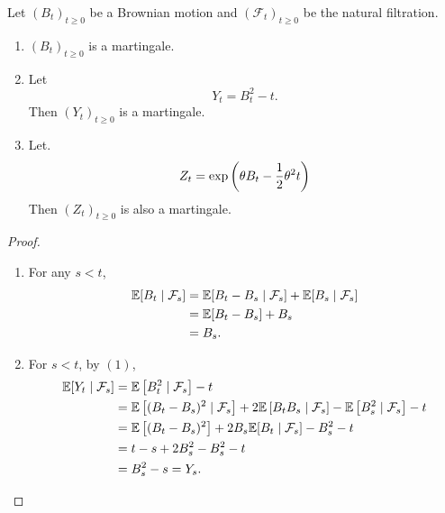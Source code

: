 \begin{exam}
    Let $(B_t)_{t \geq 0}$ be a Brownian motion and $(\mathcal{F}_t)_{t \geq 0}$ be the natural filtration.
    \begin{enumerate}[label=(\arabic{*})]
        \item $(B_t)_{t \geq 0}$ is a martingale.
        \item Let
        \begin{equation*}
            Y_t = B_t^2 - t.
        \end{equation*}
        Then $(Y_t)_{t \geq 0}$ is a martingale.
        \item Let.
        \begin{equation*}
            Z_t = \exp\left(\theta B_t - \frac{1}{2}\theta^2 t\right)
        \end{equation*}
        Then $(Z_t)_{t \geq 0}$ is also a martingale.
    \end{enumerate}
    \begin{proof}
        \begin{enumerate}[label=(\arabic{*})]
            \item For any $s < t$,
            \begin{align*}
                \mathbb{E}[B_t \mid \mathcal{F}_s] &= \mathbb{E}[B_t - B_s \mid \mathcal{F}_s] + \mathbb{E}[B_s \mid \mathcal{F}_s] \\
                &= \mathbb{E}[B_t - B_s] + B_s \\
                &= B_s.
            \end{align*}

            \item For $s < t$, by $(1)$,
            \begin{align*}
                \mathbb{E}[Y_t \mid \mathcal{F}_s] &= \mathbb{E}\left[B_t^2 \mid \mathcal{F}_s\right]  - t \\
                &= \mathbb{E}\left[(B_t - B_s)^2 \mid \mathcal{F}_s\right] +2 \mathbb{E}\left[B_tB_s \mid \mathcal{F}_s\right] - \mathbb{E}\left[B_s^2 \mid \mathcal{F}_s\right] - t \\
                &= \mathbb{E}\left[(B_t - B_s)^2\right] + 2B_s \mathbb{E}[B_t \mid \mathcal{F}_s] - B_s^2 - t  \\
                &= t-s + 2B_s^2 - B_s^2 - t \\
                &= B_s^2 - s = Y_s. 
            \end{align*}


\end{enumerate}
\end{proof}
\end{exam}
